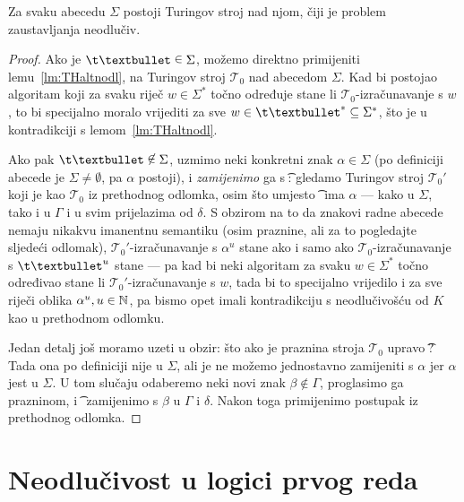 \begin{propozicija}
Za svaku abecedu $\Sigma$ postoji Turingov stroj nad njom, čiji je problem zaustavljanja neodlučiv.
\end{propozicija}
\begin{proof}
Ako je $\t\textbullet\;\raisebox{1.1pt}{$\in$}\;\Sigma$, možemo direktno primijeniti lemu~\ref{lm:THaltnodl}, na Turingov stroj $\mathcal T_0$ nad abecedom $\Sigma$. Kad bi postojao algoritam koji za svaku riječ $w\in\Sigma^*$ točno određuje stane li $\mathcal T_0$-izračunavanje s $w$, to bi specijalno moralo vrijediti za sve $w\in\t\textbullet^*\subseteq\Sigma^*$, što je u kontradikciji s lemom~\ref{lm:THaltnodl}.

Ako pak $\t\textbullet\;\raisebox{1.1pt}{$\not\in$}\;\Sigma$, uzmimo neki konkretni znak $\alpha\in\Sigma$ (po definiciji abecede je $\Sigma\not=\emptyset$, pa $\alpha$ postoji), i \emph{zamijenimo} ga s \t\textbullet: gledamo Turingov stroj $\mathcal T_0'$ koji je kao $\mathcal T_0$ iz prethodnog odlomka, osim što umjesto \t\textbullet\ ima $\alpha$ --- kako u $\Sigma$, tako i u $\Gamma$ i u svim prijelazima od $\delta$. S obzirom na to da znakovi radne abecede nemaju nikakvu imanentnu semantiku (osim praznine, ali za to pogledajte sljedeći odlomak), $\mathcal T_0'$-izračunavanje s $\alpha^u$ stane ako i samo ako $\mathcal T_0$-izračunavanje s $\t\textbullet^u$ stane --- pa kad bi neki algoritam za svaku $w\in\Sigma^*$ točno određivao stane li $\mathcal T_0'$-izračunavanje s $w$, tada bi to specijalno vrijedilo i za sve riječi oblika $\alpha^u,u\in{\mathbb N}$, pa bismo opet imali kontradikciju s neodlučivošću od $K$ kao u prethodnom odlomku.

Jedan detalj još moramo uzeti u obzir: što ako je praznina stroja $\mathcal T_0$ upravo \t\textbullet? Tada ona po definiciji nije u $\Sigma$, ali je ne možemo jednostavno zamijeniti s $\alpha$ jer $\alpha$ jest u $\Sigma$. U tom slučaju odaberemo neki novi znak $\beta\not\in\Gamma$, proglasimo ga prazninom, i \t\textbullet\ zamijenimo s $\beta$ u $\Gamma$ i $\delta$. Nakon toga primijenimo postupak iz prethodnog odlomka.
\end{proof}

\section{Neodlučivost u logici prvog reda}

